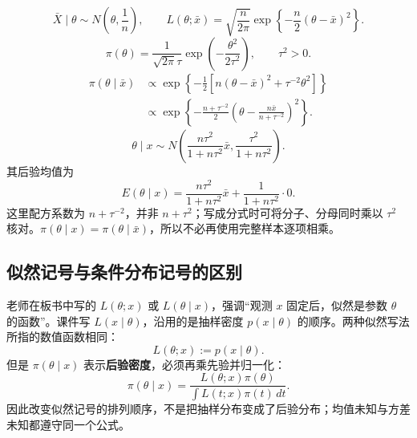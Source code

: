 \[
\bar X\mid\theta\sim N\left(\theta,\frac1n\right),\qquad
L(\theta;\bar x)=\sqrt{\frac{n}{2\pi}}
\exp\left\{-\frac n2(\theta-\bar x)^2\right\}.
\]
\[
\pi(\theta)=\frac1{\sqrt{2\pi}\tau}
\exp\left(-\frac{\theta^2}{2\tau^2}\right),\qquad\tau^2>0.
\]
\begin{align*}
\pi(\theta\mid\bar x)&\propto
\exp\left\{-\frac12\left[n(\theta-\bar x)^2+\tau^{-2}\theta^2\right]\right\}\\
&\propto\exp\left\{-\frac{n+\tau^{-2}}2
\left(\theta-\frac{n\bar x}{n+\tau^{-2}}\right)^2\right\}.
\end{align*}
\[
\boxed{\theta\mid x\sim N\left(
\frac{n\tau^2}{1+n\tau^2}\bar x,\frac{\tau^2}{1+n\tau^2}\right).}
\]
其后验均值为
\[
E(\theta\mid x)=\frac{n\tau^2}{1+n\tau^2}\bar x
+\frac1{1+n\tau^2}\cdot0.
\]
这里配方系数为 $n+\tau^{-2}$，并非 $n+\tau^2$；写成分式时可将分子、分母同时乘以 $\tau^2$ 核对。$\pi(\theta\mid x)=\pi(\theta\mid\bar x)$，所以不必再使用完整样本逐项相乘。

\subsection*{似然记号与条件分布记号的区别}
老师在板书中写的 $L(\theta;x)$ 或 $L(\theta\mid x)$，强调“观测 $x$ 固定后，似然是参数 $\theta$ 的函数”。课件写 $L(x\mid\theta)$，沿用的是抽样密度 $p(x\mid\theta)$ 的顺序。两种似然写法所指的数值函数相同：
\[
L(\theta;x):=p(x\mid\theta).
\]
但是 $\pi(\theta\mid x)$ 表示\textbf{后验密度}，必须再乘先验并归一化：
\[
\pi(\theta\mid x)=\frac{L(\theta;x)\pi(\theta)}{\int L(t;x)\pi(t)\,dt}.
\]
因此改变似然记号的排列顺序，不是把抽样分布变成了后验分布；均值未知与方差未知都遵守同一个公式。
